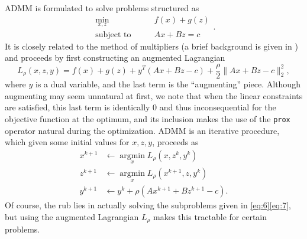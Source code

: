 \documentclass{article}
\begin{document}
ADMM is formulated to solve problems structured as
\begin{equation}
  \begin{aligned}
    \label{eq:4}
    \operatorname*{min}_{x,z} \qquad &f(x) + g(z) \\
    \text{subject to} \qquad&Ax + Bz = c
  \end{aligned}.
\end{equation}
It is closely related to the method of multipliers (a brief background is given in \cite{boyd_distributed_2011}) and proceeds by first constructing an augmented Lagrangian
\begin{equation}
  \label{eq:5}
  L_{\rho}(x,z,y) = f(x) + g(z) + y^T (Ax + Bz - c) + \frac{\rho}{2} \lVert Ax + Bz - c \rVert_2^2,
\end{equation}
where $y$ is a dual variable, and the last term is the ``augmenting'' piece.
Although augmenting may seem unnatural at first, we note that when the linear constraints are satisfied, this last term is identically 0 and thus inconsequential for the objective function at the optimum, and its inclusion makes the use of the \texttt{prox} operator natural during the optimization.
ADMM is an iterative procedure, which given some initial values for $x,z,y$, proceeds as
\begin{align}
  \label{eq:6}
  x^{k+1} &\leftarrow \operatorname*{argmin}_x L_{\rho}(x,z^k,y^k) \\
  \label{eq:7}
  z^{k+1} &\leftarrow \operatorname*{argmin}_x L_{\rho}(x^{k+1},z,y^k) \\
  \label{eq:8}
  y^{k+1} &\leftarrow y^k + \rho(Ax^{k+1} + Bz^{k+1} -c).
\end{align}
Of course, the rub lies in actually solving the subproblems given in \eqref{eq:6}\eqref{eq:7}, but using the augmented Lagrangian $L_{\rho}$ makes this tractable for certain problems.
\end{document}
